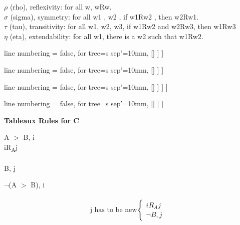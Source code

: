 \documentclass[12pt, fleqn]{article}
\begin{document}
\pagebreak
$\rho$ (rho), reflexivity: for all w, wRw.\\
$\sigma$ (sigma), symmetry: for all w1 , w2 , if w1Rw2 , then w2Rw1.\\
$\tau$ (tau), transitivity: for all w1, w2, w3, if w1Rw2 and w2Rw3, then w1Rw3\\
$\eta$ (eta), extendability: for all w1, there is a w2 such that w1Rw2.\\

\begin{multicols}{2}
\begin{tableau}
  { line numbering = false,
  for tree={s sep'=10mm},
  }
[\rho
	[\bullet
		[\downarrow
			[iRi]
		]
	]
]
\end{tableau}
\vspace{.5cm}

\begin{tableau}
  { line numbering = false,
  for tree={s sep'=10mm},
  }
[\sigma
	[iRj
		[\downarrow
			[jRi]
		]
	]
]
\end{tableau}
\vspace{.5cm}

\begin{tableau}
  { line numbering = false,
  for tree={s sep'=10mm},
  }
[\tau
	[irj
		[jRk
			[\downarrow
				[iRk]
			]
		]
	]
]
\end{tableau}
\vspace{.5cm}


\begin{tableau}
  { line numbering = false,
  for tree={s sep'=10mm},
  }
[\eta
	[\bullet
		[\downarrow
			[iRj]
		]
	]
]
\end{tableau}
\vspace{.5cm}

\end{multicols}

\vspace{.5cm}
\textbf{Tableaux Rules for C}\\
\begin{multicols}{2}
\hspace{3.3cm}A $>$ B, i\\
\hspace*{3.8cm}iR\textsubscript{A}j\\
\hspace*{4.0cm}{\Large $\downarrow$}\\
\hspace*{3.8cm}B, j\\
\vspace{2cm}

\hspace{2.8cm}$\neg$(A $>$ B), i\\
\hspace*{4.0cm}{\Large $\downarrow$}\\
\begin{equation*}
  \text{j has to be new}\begin{cases}
    iR_Aj&\\
    \neg B, j
  \end{cases}
\end{equation*}
\end{multicols}
\end{document}
